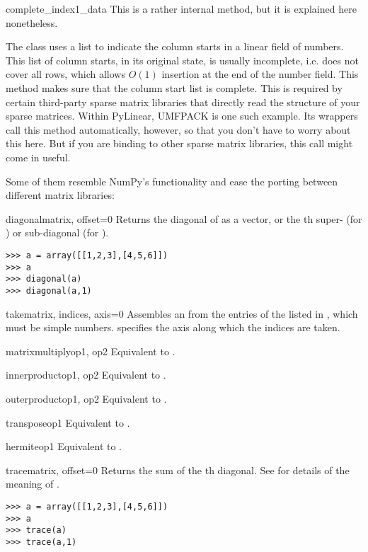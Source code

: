 \begin{methoddesc}[SparseExecuteMatrix]{complete_index1_data}{}
  This is a rather internal method, but it is explained here
  nonetheless.

  The  class uses a list to indicate the
  column starts in a linear field of numbers. This list of column
  starts, in its original state, is usually incomplete, i.e. does not
  cover all rows, which allows $O(1)$ insertion at the end of the
  number field. This method makes sure that the column start list is
  complete. This is required by certain third-party sparse matrix
  libraries that directly read the structure of your sparse
  matrices. Within PyLinear, UMFPACK is one such example. Its wrappers
  call this method automatically, however, so that you don't have to
  worry about this here. But if you are binding to other sparse matrix
  libraries, this call might come in useful.
\end{methoddesc}

Some of them resemble NumPy's functionality and ease the porting between
different matrix libraries:

\begin{funcdesc}{diagonal}{matrix, offset=0}
  Returns the diagonal of  as a vector, or the th
  super- (for ) or sub-diagonal (for ).
\begin{verbatim}
>>> a = array([[1,2,3],[4,5,6]])
>>> a
>>> diagonal(a)
>>> diagonal(a,1)
\end{verbatim}
\end{funcdesc}
\begin{funcdesc}{take}{matrix, indices, axis=0}
  Assembles an  from the entries of the 
  listed in , which must be simple numbers. 
  specifies the axis along which the indices are taken.
\end{funcdesc}
\begin{funcdesc}{matrixmultiply}{op1, op2}
  Equivalent to .
\end{funcdesc}
\begin{funcdesc}{innerproduct}{op1, op2}
  Equivalent to .
\end{funcdesc}
\begin{funcdesc}{outerproduct}{op1, op2}
  Equivalent to .
\end{funcdesc}
\begin{funcdesc}{transpose}{op1}
  Equivalent to .
\end{funcdesc}
\begin{funcdesc}{hermite}{op1}
  Equivalent to .
\end{funcdesc}
\begin{funcdesc}{trace}{matrix, offset=0}
  Returns the sum of the th diagonal. See 
  for details of the meaning of .
\begin{verbatim}
>>> a = array([[1,2,3],[4,5,6]])
>>> a
>>> trace(a)
>>> trace(a,1)
\end{verbatim}
\end{funcdesc}
